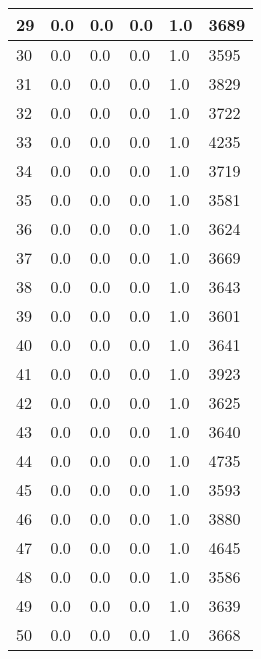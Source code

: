 \begin{longtable}{|l|l|l|l|l|l|}
29 & 0.0 & 0.0 & 0.0 & 1.0 & 3689 \\ \hline 
30 & 0.0 & 0.0 & 0.0 & 1.0 & 3595 \\ \hline 
31 & 0.0 & 0.0 & 0.0 & 1.0 & 3829 \\ \hline 
32 & 0.0 & 0.0 & 0.0 & 1.0 & 3722 \\ \hline 
33 & 0.0 & 0.0 & 0.0 & 1.0 & 4235 \\ \hline 
34 & 0.0 & 0.0 & 0.0 & 1.0 & 3719 \\ \hline 
35 & 0.0 & 0.0 & 0.0 & 1.0 & 3581 \\ \hline 
36 & 0.0 & 0.0 & 0.0 & 1.0 & 3624 \\ \hline 
37 & 0.0 & 0.0 & 0.0 & 1.0 & 3669 \\ \hline 
38 & 0.0 & 0.0 & 0.0 & 1.0 & 3643 \\ \hline 
39 & 0.0 & 0.0 & 0.0 & 1.0 & 3601 \\ \hline 
40 & 0.0 & 0.0 & 0.0 & 1.0 & 3641 \\ \hline 
41 & 0.0 & 0.0 & 0.0 & 1.0 & 3923 \\ \hline 
42 & 0.0 & 0.0 & 0.0 & 1.0 & 3625 \\ \hline 
43 & 0.0 & 0.0 & 0.0 & 1.0 & 3640 \\ \hline 
44 & 0.0 & 0.0 & 0.0 & 1.0 & 4735 \\ \hline 
45 & 0.0 & 0.0 & 0.0 & 1.0 & 3593 \\ \hline 
46 & 0.0 & 0.0 & 0.0 & 1.0 & 3880 \\ \hline 
47 & 0.0 & 0.0 & 0.0 & 1.0 & 4645 \\ \hline 
48 & 0.0 & 0.0 & 0.0 & 1.0 & 3586 \\ \hline 
49 & 0.0 & 0.0 & 0.0 & 1.0 & 3639 \\ \hline 
50 & 0.0 & 0.0 & 0.0 & 1.0 & 3668 \\ \hline 
\end{longtable}